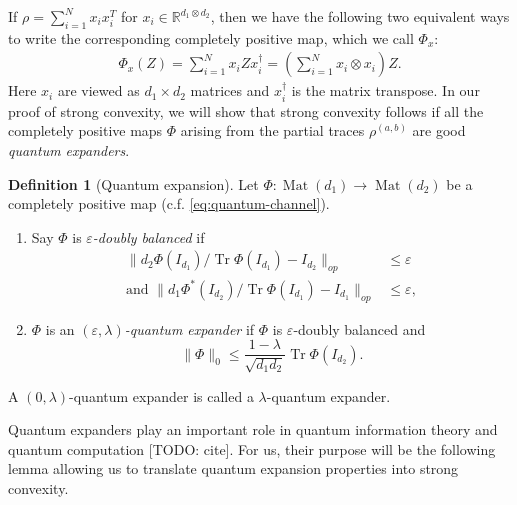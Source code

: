 \documentclass[aos]{imsart}
\theoremstyle{definition}
\newtheorem{definition}[theorem]{Definition}
\numberwithin{equation}{section}
\DeclareMathOperator{\mat}{Mat}
\DeclareMathOperator{\tr}{Tr}
\newcommand{\R}{{\mathbb{R}}}
\newcommand{\ot}{\otimes}
\newcommand{\eps}{\varepsilon}
\newcommand{\samp}{x}
\newcommand{\TODO}[1]{{\color{blue}[TODO: #1]}}
\begin{document}
 
 
 If $\rho = \sum_{i = 1}^N x_i x_i^T$ for $x_i \in \R^{d_1 \ot d_2}$, then we have the following two equivalent ways to write the corresponding completely positive map, which we call $\Phi_{\samp}$:
\begin{align} \Phi_{\samp}(Z) = \sum_{i = 1}^N x_i Z x_i^\dagger = \left(\sum_{i = 1}^N x_i \ot x_i\right) Z.\label{eq:quantum-channel}\end{align}
Here $x_i$ are viewed as $d_1 \times d_2$ matrices and $x_i^\dagger$ is the matrix transpose. In our proof of strong convexity, we will show that strong convexity follows if all the completely positive maps $\Phi$ arising from the partial traces $\rho^{(a,b)}$ are good \emph{quantum expanders}. 

\begin{definition}[Quantum expansion] Let $\Phi:\mat(d_1) \to \mat(d_2)$ be a completely positive map (c.f. \cref{eq:quantum-channel}).
\begin{enumerate}
\item Say $\Phi$ is \emph{$\eps$-doubly balanced} if
\begin{align*}
\|d_2 \Phi(I_{d_1})/\tr \Phi(I_{d_1})  - I_{d_2} \|_{op}& \leq \eps\\
\textrm{and }\|d_1 \Phi^*(I_{d_2})/\tr \Phi(I_{d_1})  - I_{d_1}  \|_{op} & \leq \eps,
\end{align*}
\item $\Phi$ is an \emph{$(\eps, \lambda)$-quantum expander} if $\Phi$ is $\eps$-doubly balanced and
$$\|\Phi\|_0 \leq \frac{1-\lambda}{\sqrt{d_1d_2}} \tr \Phi(I_{d_2}).$$
\end{enumerate}
A $(0, \lambda)$-quantum expander is called a $\lambda$-quantum expander.
\end{definition}





Quantum expanders play an important role in quantum information theory and quantum computation \TODO{cite}. For us, their purpose will be the following lemma allowing us to translate quantum expansion properties into strong convexity.
\end{document}
